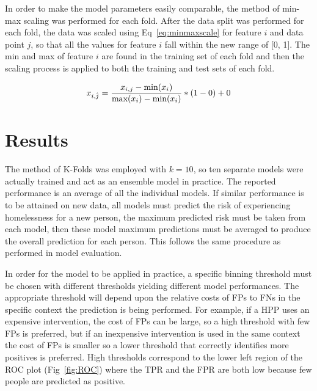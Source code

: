 \documentclass[10pt,letterpaper]{article}
\newcommand{\red}[1]{{\color{red}{#1}}}
\begin{document}
In order to make the model parameters easily comparable, the method of min-max scaling was performed for each fold. After the data split was performed for each fold, the data was scaled using Eq~\ref{eq:minmaxscale} for feature $i$ and data point $j$, so that all the values for feature $i$ fall within the new range of [0, 1]. The min and max of feature $i$ are found in the training set of each fold and then the scaling process is applied to both the training and test sets of each fold.

\begin{equation}
    \centering
    x_{i, \hat{j}} = \frac{x_{i, j} - \text{min}(x_{i})}{\text{max}(x_{i}) - \text{min}(x_{i})}
    * (1 - 0) + 0
    \label{eq:minmaxscale}
\end{equation}

\section*{Results}
The method of K-Folds was employed with $k=10$, so ten separate models were actually trained and act as an ensemble model in practice. The reported performance is an average of all the individual models. If similar performance is to be attained on new data, all models must predict the risk of experiencing homelessness for a new person, the maximum predicted risk must be taken from each model, then these model maximum predictions must be averaged to produce the overall prediction for each person. This follows the same procedure as performed in model evaluation.

In order for the model to be applied in practice, a specific binning threshold must be chosen with different thresholds yielding different model performances. The appropriate threshold will depend upon the relative costs of FPs to FNs in the specific context the prediction is being performed. For example, if a HPP uses an expensive intervention, the cost of FPs can be large, so a high threshold with few FPs is preferred, but if an inexpensive intervention is used in the same context the cost of FPs is smaller so a lower threshold that correctly identifies more positives is preferred. High thresholds correspond to the lower left region of the ROC plot (Fig~\ref{fig:ROC}) where the TPR and the FPR are both low because few people are predicted as positive. \red{reduce or remove paragraph?}
\end{document}
